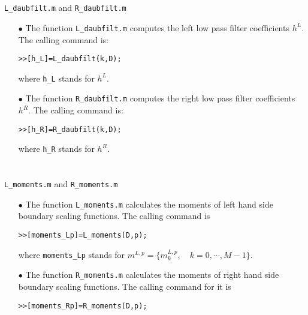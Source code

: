 \documentclass[acmtoms]{acmtrans2m}
\begin{document}
\section{} \verb#L_daubfilt.m# and \verb#R_daubfilt.m# 
\begin{itemize}
\item[$\bullet$]
The function \verb#L_daubfilt.m# computes the left low pass filter coefficients
$h^L$. The calling command is:
\begin{alltt}
>>[h_L]=L_daubfilt(k,D);
\end{alltt}
where \verb#h_L# stands for $h^L$.
\item[$\bullet$]
The function \verb#R_daubfilt.m# computes the right low pass filter coefficients $h^R$. The calling command is:
\begin{alltt}
>>[h_R]=R_daubfilt(k,D);
\end{alltt}
where \verb#h_R# stands for $h^R$.
\end{itemize}
\section{} \verb#L_moments.m# and \verb#R_moments.m#
\begin{itemize}
\item[$\bullet$]
The function \verb#L_moments.m# calculates the moments of left hand side boundary scaling functions. The calling command is
\begin{alltt}
>>[moments_Lp]=L_moments(D,p);
\end{alltt}
where \verb#moments_Lp# stands for $m^{L,p}=\{m^{L,p}_k, \quad k=0,\cdots,M-1\}$.
\item[$\bullet$] 
The function \verb#R_moments.m# calculates the moments of right hand side boundary scaling functions. The calling command for it is
\begin{alltt}
>>[moments_Rp]=R_moments(D,p);
\end{alltt}
\end{itemize}

\end{document}
